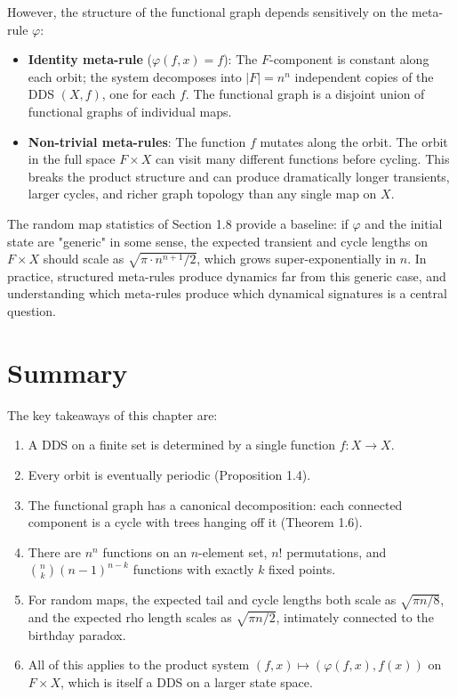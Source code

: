 However, the structure of the functional graph depends sensitively on the meta-rule $\varphi$:

\begin{itemize}
\item \textbf{Identity meta-rule} ($\varphi(f,x) = f$): The $F$-component is constant along each orbit; the system decomposes into $|F| = n^n$ independent copies of the DDS $(X, f)$, one for each $f$. The functional graph is a disjoint union of functional graphs of individual maps.
\end{itemize}

\begin{itemize}
\item \textbf{Non-trivial meta-rules}: The function $f$ mutates along the orbit. The orbit in the full space $F \times X$ can visit many different functions before cycling. This breaks the product structure and can produce dramatically longer transients, larger cycles, and richer graph topology than any single map on $X$.
\end{itemize}

The random map statistics of Section 1.8 provide a baseline: if $\varphi$ and the initial state are "generic" in some sense, the expected transient and cycle lengths on $F \times X$ should scale as $\sqrt{\pi \cdot n^{n+1}/2}$, which grows super-exponentially in $n$. In practice, structured meta-rules produce dynamics far from this generic case, and understanding which meta-rules produce which dynamical signatures is a central question.

\section{Summary}

The key takeaways of this chapter are:

\begin{enumerate}
\item A DDS on a finite set is determined by a single function $f: X \to X$.
\item Every orbit is eventually periodic (Proposition 1.4).
\item The functional graph has a canonical decomposition: each connected component is a cycle with trees hanging off it (Theorem 1.6).
\item There are $n^n$ functions on an $n$-element set, $n!$ permutations, and $\binom{n}{k}(n-1)^{n-k}$ functions with exactly $k$ fixed points.
\item For random maps, the expected tail and cycle lengths both scale as $\sqrt{\pi n/8}$, and the expected rho length scales as $\sqrt{\pi n/2}$, intimately connected to the birthday paradox.
\item All of this applies to the product system $(f, x) \mapsto (\varphi(f,x), f(x))$ on $F \times X$, which is itself a DDS on a larger state space.
\end{enumerate}



